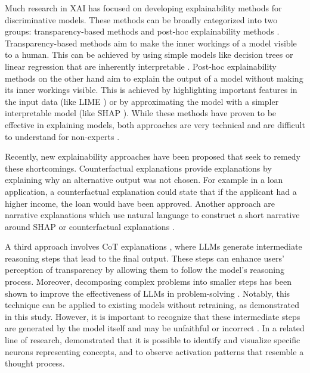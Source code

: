 Much research in \ac{XAI} has focused on developing explainability methods for discriminative models. These methods can be broadly categorized into two groups: transparency-based methods and post-hoc explainability methods \parencite{Arrieta2020}. Transparency-based methods aim to make the inner workings of a model visible to a human. This can be achieved by using simple models like decision trees or linear regression that are inherently interpretable \parencite{Rudin2019}. Post-hoc explainability methods on the other hand aim to explain the output of a model without making its inner workings visible. This is achieved by highlighting important features in the input data (like LIME \parencite{Ribeiro2016}) or by approximating the model with a simpler interpretable model (like SHAP \parencite{Lundberg2017}). While these methods have proven to be effective in explaining models, both approaches are very technical and are difficult to understand for non-experts \parencite{Martens2025}.

Recently, new explainability approaches have been proposed that seek to remedy these shortcomings. Counterfactual explanations \parencite{Wachter2017} provide explanations by explaining why an alternative output was not chosen. For example in a loan application, a counterfactual explanation could state that if the applicant had a higher income, the loan would have been approved. Another approach are narrative explanations which use natural language to construct a short narrative around SHAP or counterfactual explanations \parencite{Martens2025}.

A third approach involves \ac{CoT} explanations \parencite{Wei2022}, where \acp{LLM} generate intermediate reasoning steps that lead to the final output. These steps can enhance users' perception of transparency by allowing them to follow the model's reasoning process. Moreover, decomposing complex problems into smaller steps has been shown to improve the effectiveness of \acp{LLM} in problem-solving \parencite{Wei2022}. Notably, this technique can be applied to existing models without retraining, as demonstrated in this study. However, it is important to recognize that these intermediate steps are generated by the model itself and may be unfaithful or incorrect \parencite{Turpin2023, Schneider2024}. In a related line of research, \textcite{Lindsey2025} demonstrated that it is possible to identify and visualize specific neurons representing concepts, and to observe activation patterns that resemble a thought process.


